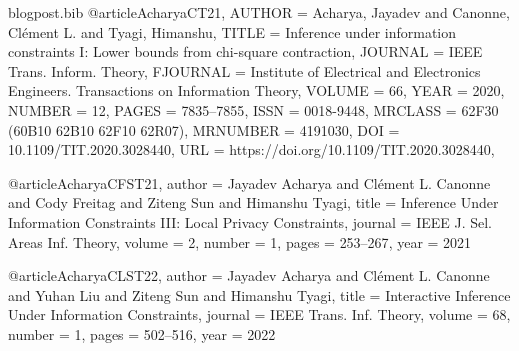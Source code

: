 \documentclass[11pt]{article}
\begin{document}
\begin{filecontents*}{blogpost.bib}
@article{AcharyaCT21,
    AUTHOR = {Acharya, Jayadev and Canonne, Cl\'{e}ment L. and Tyagi, Himanshu},
     TITLE = {Inference under information constraints {I}: {L}ower bounds
              from chi-square contraction},
   JOURNAL = {IEEE Trans. Inform. Theory},
  FJOURNAL = {Institute of Electrical and Electronics Engineers.
              Transactions on Information Theory},
    VOLUME = {66},
      YEAR = {2020},
    NUMBER = {12},
     PAGES = {7835--7855},
      ISSN = {0018-9448},
   MRCLASS = {62F30 (60B10 62B10 62F10 62R07)},
  MRNUMBER = {4191030},
       DOI = {10.1109/TIT.2020.3028440},
       URL = {https://doi.org/10.1109/TIT.2020.3028440},
}

@article{AcharyaCFST21,
  author    = {Jayadev Acharya and
               Cl{\'{e}}ment L. Canonne and
               Cody Freitag and
               Ziteng Sun and
               Himanshu Tyagi},
  title     = {Inference Under Information Constraints {III:} Local Privacy Constraints},
  journal   = {{IEEE} J. Sel. Areas Inf. Theory},
  volume    = {2},
  number    = {1},
  pages     = {253--267},
  year      = {2021}
}

@article{AcharyaCLST22,
  author    = {Jayadev Acharya and
               Cl{\'{e}}ment L. Canonne and
               Yuhan Liu and
               Ziteng Sun and
               Himanshu Tyagi},
  title     = {Interactive Inference Under Information Constraints},
  journal   = {{IEEE} Trans. Inf. Theory},
  volume    = {68},
  number    = {1},
  pages     = {502--516},
  year      = {2022}
}

\end{filecontents*}


\end{document}
